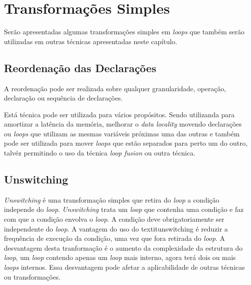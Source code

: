 
\section{Transformações Simples}

Serão apresentadas algumas transformações simples em \textit{loops} que também
serão utilizadas em outras técnicas apresentadas neste capítulo.

\subsection{Reordenação das Declarações}

A reordenação pode ser realizada sobre qualquer granularidade, operação,
declaração ou sequência de declarações.

Está técnica pode ser utilizada para vários propósitos. Sendo utilizanda para 
amortizar a latência da memória, melhorar o \textit{data locality} movendo 
declarações ou \textit{loops} que utilizam as mesmas variáveis próximas uma das 
outras e também pode ser utilizada para mover \textit{loops} que estão separados 
para perto um do outro, talvéz permitindo o uso da técnica \textit{loop fusion} 
ou outra técnica.




\subsection{Unswitching}

\textit{Unswitching} é uma transformação simples que retira do \textit{loop} 
a condição independe do \textit{loop}. 
\textit{Unswitching} trata um \textit{loop} que contenha uma condição e faz com 
que a condição envolva o \textit{loop}. 
A condição deve obrigatoriamente ser independente do \textit{loop}.
A vantagem do uso do textit{unswitching} é reduzir a frequência de execução da 
condição, uma vez que fora retirada do \textit{loop}. 
A desvantagem desta tranformação é o aumento da complexidade da estrutura do 
\textit{loop}, um \textit{loop} contendo apenas um \textit{loop} mais interno,
agora terá dois ou mais \textit{loops} internos. 
Essa desvantagem pode afetar a aplicabilidade de outras técnicas ou
transformações.




